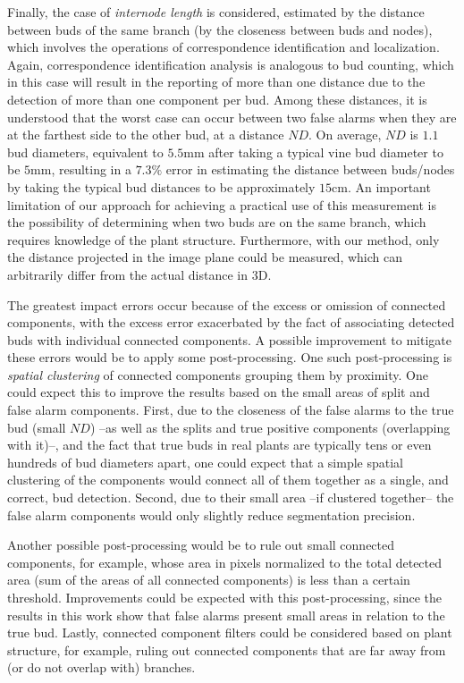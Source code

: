 \documentclass[a4paper,authoryear,review]{elsarticle}
\begin{document}
	
	Finally, the case of \emph{internode length} is considered, estimated by the distance between buds of the same branch (by the closeness between buds and nodes), which involves the operations of correspondence identification and localization. Again, correspondence identification analysis is analogous to bud counting, which in this case will result in the reporting of more than one distance due to the detection of more than one component per bud. Among these distances, it is understood that the worst case can occur between two false alarms when they are at the farthest side to the other bud, at a distance $ND$. On average, $ND$ is $1.1$ bud diameters, equivalent to $5.5$mm after taking a typical vine bud diameter to be $5$mm, resulting in a $7.3\%$ error in estimating the distance between buds/nodes by taking the typical bud distances to be approximately $15$cm. 
	An important limitation of our approach for achieving a practical use of this measurement is the possibility of determining when two buds are on the same branch, which requires knowledge of the plant structure. Furthermore, with our method, only the distance projected in the image plane could be measured, which can arbitrarily differ from the actual distance in 3D. 
	
	
	The greatest impact errors occur because of the excess or omission of connected components, with the excess error exacerbated by the fact of associating detected buds with individual connected components. A possible improvement to mitigate these errors would be to apply some post-processing. 
	One such post-processing is \emph{spatial clustering} of connected components grouping them by proximity. One could expect this to improve the results based on the small areas of split and false alarm components. First, due to the closeness of the false alarms to the true bud (small $ND$) --as well as the splits and true positive components (overlapping with it)--, and the fact that true buds in real plants are typically tens or even hundreds of bud diameters apart, one could expect that a simple spatial clustering of the components would connect all of them together as a single, and correct, bud detection. Second, due to their small area --if clustered together-- the false alarm components would only slightly reduce segmentation precision.
	
	Another possible post-processing would be to rule out small connected components, for example, whose area in pixels normalized to the total detected area (sum of the areas of all connected components) is less than a certain threshold. Improvements could be expected with this post-processing, since the results in this work show that false alarms present small areas in relation to the true bud. Lastly, connected component filters could be considered based on plant structure, for example, ruling out connected components that are far away from (or do not overlap with) branches.
	
\end{document}
